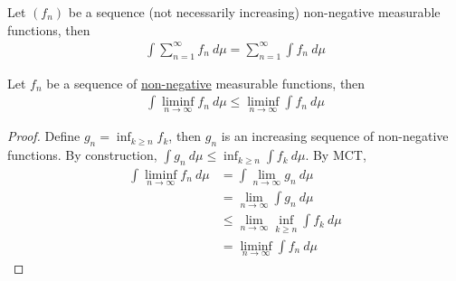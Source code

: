 \documentclass[11pt]{article}
\begin{document}
	\begin{corollary}
		Let $(f_n)$ be a sequence (not necessarily increasing) non-negative measurable functions, then
		\begin{align}
			\int \sum_{n=1}^\infty f_n\ d\mu = \sum_{n=1}^\infty \int f_n\ d\mu
		\end{align}
	\end{corollary}
	
	\begin{theorem}
		Let $f_n$ be a sequence of \ul{non-negative} measurable functions, then
		\begin{align}
			\int \liminf_{n\to\infty} f_n\ d\mu \leq \liminf_{n\to\infty} \int f_n\ d\mu
		\end{align}
		\begin{proof}
			Define $g_n = \inf_{k \geq n} f_k$, then $g_n$ is an increasing sequence of non-negative functions. By construction, $\int g_n\ d\mu \leq \inf_{k \geq n}\int f_k\ d\mu$.
			By MCT,
			\begin{align}
				\int \liminf_{n \to \infty} f_n\ d\mu &= \int \lim_{n\to\infty} g_n\ d\mu \\
				&= \lim_{n\to\infty} \int g_n\ d\mu \\
				&\leq \lim_{n\to\infty} \inf_{k \geq n}\int f_k\ d\mu \\
				&= \liminf_{n\to\infty} \int f_n\ d\mu
			\end{align}
		\end{proof}
	\end{theorem}
	
\end{document}

